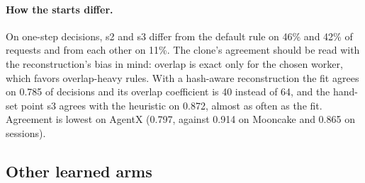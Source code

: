 \paragraph{How the starts differ.}
On one-step decisions, s2 and s3 differ from the default rule on 46\% and 42\% of requests and from
each other on 11\%. The clone's agreement should be read with the reconstruction's bias in mind:
overlap is exact only for the chosen worker, which favors overlap-heavy rules. With a hash-aware
reconstruction the fit agrees on 0.785 of decisions and its overlap coefficient is 40 instead of
64, and the hand-set point s3 agrees with the heuristic on 0.872, almost as often as the fit.
Agreement is lowest on AgentX (0.797, against 0.914 on Mooncake and 0.865 on sessions).

\subsection{Other learned arms}

